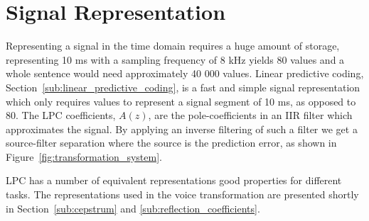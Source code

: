 
\section{Signal Representation} %
\label{the:signal_representation}
Representing a signal in the time domain requires a huge amount of storage, \eg representing 10 ms with a sampling frequency of 8 kHz yields 80 values and a whole sentence would need approximately 40 000 values. Linear predictive coding, Section~\ref{sub:linear_predictive_coding}, is a fast and simple signal representation which only requires  values to represent a signal segment of 10 ms, as opposed to 80. The LPC coefficients, $A(z)$, are the pole-coefficients in an IIR filter which approximates the signal. By applying an inverse filtering of such a filter we get a source-filter separation where the source is the prediction error, as shown in Figure~\ref{fig:transformation_system}.

LPC has a number of equivalent representations good properties for different tasks. The representations used in the voice transformation are presented shortly in Section~\ref{sub:cepstrum} and \ref{sub:reflection_coefficients}.

